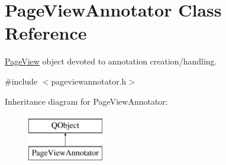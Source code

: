 \hypertarget{classPageViewAnnotator}{\section{Page\+View\+Annotator Class Reference}
\label{classPageViewAnnotator}
}


\hyperlink{classPageView}{Page\+View} object devoted to annotation creation/handling.  




{\ttfamily \#include $<$pageviewannotator.\+h$>$}

Inheritance diagram for Page\+View\+Annotator\+:\begin{figure}[H]
\begin{center}
\leavevmode
\includegraphics[height=2.000000cm]{classPageViewAnnotator}
\end{center}
\end{figure}
